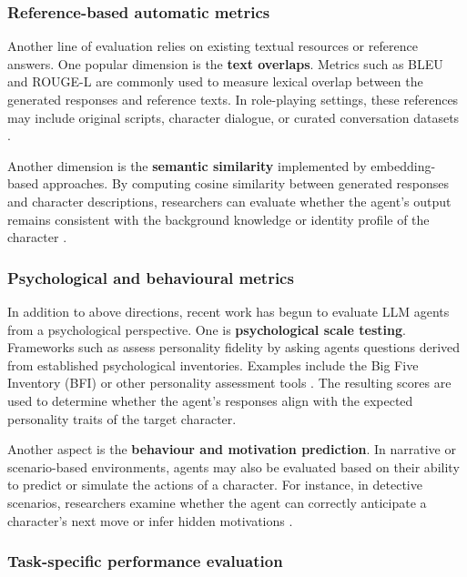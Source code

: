 \documentclass{article}
\begin{document}
\subsubsection{Reference-based automatic metrics}

Another line of evaluation relies on existing textual resources or reference answers. One popular dimension is the \textbf{text overlaps}. Metrics such as BLEU and ROUGE-L are commonly used to measure lexical overlap between the generated responses and reference texts. In role-playing settings, these references may include original scripts, character dialogue, or curated conversation datasets \citep{chen2023hp, wang2024rolellm, wang2024character100}.

Another dimension is the \textbf{semantic similarity} implemented by embedding-based approaches. By computing cosine similarity between generated responses and character descriptions, researchers can evaluate whether the agent’s output remains consistent with the background knowledge or identity profile of the character \citep{wang2024character100}. 

\subsubsection{Psychological and behavioural metrics}

In addition to above directions, recent work has begun to evaluate LLM agents from a psychological perspective. One is \textbf{psychological scale testing}. Frameworks such as \cite{wang2024incharacter} assess personality fidelity by asking agents questions derived from established psychological inventories. Examples include the Big Five Inventory (BFI) or other personality assessment tools \citep{pan2023llms}. The resulting scores are used to determine whether the agent’s responses align with the expected personality traits of the target character.

Another aspect is the \textbf{behaviour and motivation prediction}. In narrative or scenario-based environments, agents may also be evaluated based on their ability to predict or simulate the actions of a character. For instance, in detective scenarios, researchers examine whether the agent can correctly anticipate a character’s next move or infer hidden motivations \citep{shao2023characterllm, chen2024socialbench, wang2024incharacter, xu2024destiny}.

\subsubsection{Task-specific performance evaluation}
\end{document}
